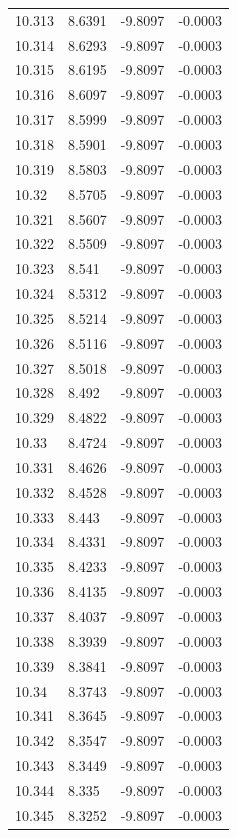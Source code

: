 \begin{tabular}{llll}
10.313 & 8.6391 & -9.8097 & -0.0003 \\
10.314 & 8.6293 & -9.8097 & -0.0003 \\
10.315 & 8.6195 & -9.8097 & -0.0003 \\
10.316 & 8.6097 & -9.8097 & -0.0003 \\
10.317 & 8.5999 & -9.8097 & -0.0003 \\
10.318 & 8.5901 & -9.8097 & -0.0003 \\
10.319 & 8.5803 & -9.8097 & -0.0003 \\
10.32 & 8.5705 & -9.8097 & -0.0003 \\
10.321 & 8.5607 & -9.8097 & -0.0003 \\
10.322 & 8.5509 & -9.8097 & -0.0003 \\
10.323 & 8.541 & -9.8097 & -0.0003 \\
10.324 & 8.5312 & -9.8097 & -0.0003 \\
10.325 & 8.5214 & -9.8097 & -0.0003 \\
10.326 & 8.5116 & -9.8097 & -0.0003 \\
10.327 & 8.5018 & -9.8097 & -0.0003 \\
10.328 & 8.492 & -9.8097 & -0.0003 \\
10.329 & 8.4822 & -9.8097 & -0.0003 \\
10.33 & 8.4724 & -9.8097 & -0.0003 \\
10.331 & 8.4626 & -9.8097 & -0.0003 \\
10.332 & 8.4528 & -9.8097 & -0.0003 \\
10.333 & 8.443 & -9.8097 & -0.0003 \\
10.334 & 8.4331 & -9.8097 & -0.0003 \\
10.335 & 8.4233 & -9.8097 & -0.0003 \\
10.336 & 8.4135 & -9.8097 & -0.0003 \\
10.337 & 8.4037 & -9.8097 & -0.0003 \\
10.338 & 8.3939 & -9.8097 & -0.0003 \\
10.339 & 8.3841 & -9.8097 & -0.0003 \\
10.34 & 8.3743 & -9.8097 & -0.0003 \\
10.341 & 8.3645 & -9.8097 & -0.0003 \\
10.342 & 8.3547 & -9.8097 & -0.0003 \\
10.343 & 8.3449 & -9.8097 & -0.0003 \\
10.344 & 8.335 & -9.8097 & -0.0003 \\
10.345 & 8.3252 & -9.8097 & -0.0003 \\

\end{tabular}

